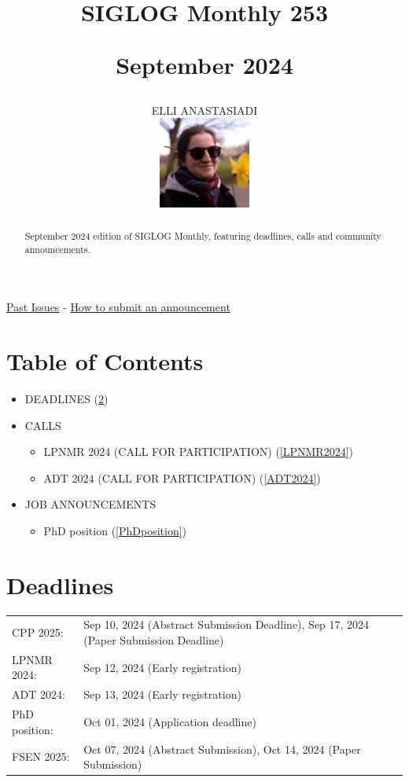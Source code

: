 \documentclass[prodmode,acmtecs]{acmsmall} %
\newcounter{colstart}
\begin{document}
\setcounter{colstart}{\thepage}

\title{{\huge\sc SIGLOG Monthly 253}

 September 2024}\author{ELLI ANASTASIADI\vspace*{-2.6cm}\begin{flushright}\includegraphics[width=30mm]{elli_anastasiadi.png}\end{flushright}}\begin{abstract}September 2024 edition of SIGLOG Monthly, featuring deadlines, calls and community announcements.
\end{abstract}


\maketitlee

\href{https://lics.siglog.org/newsletters/}{Past Issues}
 - 
\href{https://lics.siglog.org/newsletters/inst.html}{How to submit an announcement}
\section{Table of Contents}\begin{itemize}\item DEADLINES (\cref{deadlines}) 
 
\item CALLS 
 
\begin{itemize}\item LPNMR 2024 (CALL FOR PARTICIPATION) (\cref{LPNMR2024})
\item ADT 2024 (CALL FOR PARTICIPATION) (\cref{ADT2024})
\end{itemize} 
\item JOB ANNOUNCEMENTS 
 
\begin{itemize}\item PhD position (\cref{PhDposition})
\end{itemize} 
\end{itemize}\section{Deadlines}\label{deadlines}\begin{tabulary}{\linewidth}{LL}CPP 2025:  & Sep 10, 2024 (Abstract Submission Deadline), Sep 17, 2024 (Paper Submission Deadline) \\
LPNMR 2024:  & Sep 12, 2024 (Early registration) \\
ADT 2024:  & Sep 13, 2024 (Early registration) \\
PhD position:  & Oct 01, 2024 (Application deadline) \\
FSEN 2025:  & Oct 07, 2024 (Abstract Submission), Oct 14, 2024 (Paper Submission) \\
\end{tabulary}
\end{document}
